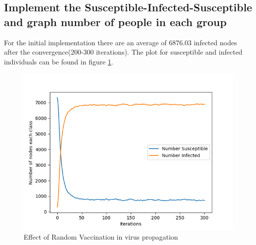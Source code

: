 \documentclass[11pt]{article}
\begin{document}
\subsection{Implement the Susceptible-Infected-Susceptible and graph number of people in each group}
For the initial implementation there are an average of 6876.03 infected nodes
after the convergence(200-300 iterations). The plot for susceptible and infected individuals can be found  in figure \ref{fig:sis}.
\begin{figure}
    \centering
    \includegraphics{Assignments/Assignment2/sis.png}
    \caption{Effect of Random Vaccination in virus propagation}
    \label{fig:sis}
\end{figure}
\end{document}
